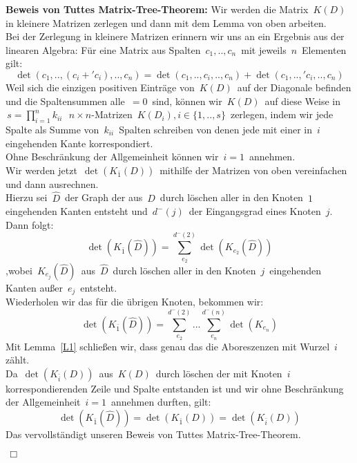 \textbf{Beweis von Tuttes Matrix-Tree-Theorem:}
Wir werden die Matrix $\,K(D)\,$ in kleinere Matrizen zerlegen und dann mit dem Lemma von oben arbeiten.\\
Bei der Zerlegung in kleinere Matrizen erinnern wir uns an ein Ergebnis aus der linearen Algebra:
Für eine Matrix aus Spalten $\,c_1,..,c_n\,$ mit jeweils $\,n\,$ Elementen gilt:
\begin{equation}
 \det(c_1,..,(c_i+\prime{c_i}),..,c_n) = \det(c_1,..,c_i,..,c_n) + \det(c_1,..,\prime{c_i},..,c_n)
\end{equation}
Weil sich die einzigen positiven Einträge von $\,K(D)\,$ auf der Diagonale befinden und die Spaltensummen alle $\,=0\,$ sind, können wir $\,K(D)\,$ auf diese Weise in  $\,s=\prod_{i=1}^nk_{ii}\,$ $\,n \times n$-Matrizen $\,K(D_i), i\in\{1,..,s\}\,$ zerlegen, indem wir jede Spalte als Summe von $\,k_{ii}\,$ Spalten schreiben von denen jede mit einer in $\,i\,$ eingehenden Kante korrespondiert.\\
Ohne Beschränkung der Allgemeinheit können wir $\,i=1\,$ annehmen.\\
Wir werden jetzt $\,\det(K_{\bar{1}}(D))\,$ mithilfe der Matrizen von oben vereinfachen und dann ausrechnen.\\
Hierzu sei $\,\hat{D}\,$ der Graph der aus $\,D\,$ durch löschen aller in den Knoten $\,1\,$ eingehenden Kanten entsteht und $\,d^{-}(j)\,$ der Eingangsgrad eines Knoten $\,j$.\;  Dann folgt:
\begin{equation}
 \det(K_{\bar{1}}(\hat{D})) = \sum_{e_2}^{d^{-}(2)}\det(K_{e_2}(\hat{D}))
\end{equation}
,wobei $\,K_{e_j}(\hat{D})\,$ aus $\,\hat{D}\,$ durch löschen aller in den Knoten $\,j\,$ eingehenden Kanten außer $\,e_j\,$ entsteht.\\
Wiederholen wir das für die übrigen Knoten, bekommen wir:
\begin{equation}
  \det(K_{\bar{1}}(\hat{D})) = \sum_{e_2}^{d^{-}(2)}...\sum_{e_n}^{d^{-}(n)}\det(K_{e_n})
\end{equation}
Mit Lemma~\ref{L1} schließen wir, dass genau das die Aboreszenzen mit Wurzel $\,i\,$ zählt.\\
Da $\,\det(K_{\bar{i}}(D))\,$ aus $\,K(D)\,$ durch löschen der mit Knoten $\,i\,$ korrespondierenden Zeile und Spalte entstanden ist und wir ohne Beschränkung der Allgemeinheit $\,i=1\,$ annehmen durften, gilt:
\begin{equation}
 \det(K_{\bar{1}}(\hat{D}))=\det(K_{\bar{1}}(D))=\det(K_{\bar{i}}(D))
\end{equation}
Das vervollständigt unseren Beweis von Tuttes Matrix-Tree-Theorem.
\begin{flushright} $\,\Box\,$ \end{flushright} 

